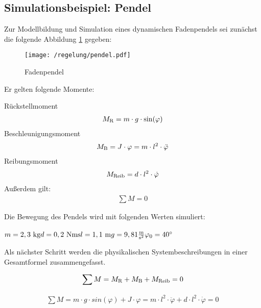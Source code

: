 \subsection{Simulationsbeispiel: Pendel}

Zur Modellbildung und Simulation eines dynamischen Fadenpendels sei zunächst die folgende Abbildung \ref{fig:pendel} gegeben:

\begin{figure}[h]
	\centering
	\texttt{[image: /regelung/pendel.pdf]}
	\label{fig:pendel}
	\caption{Fadenpendel}
\end{figure}

Er gelten folgende Momente:

Rückstellmoment
\begin{align}
		M_\i{R} = m \cdot g \cdot \si{sin}(\varphi)
		\label{rueckstellmoment} 
\end{align}
Beschleunigungsmoment
\begin{align}
	M_\i{B} = J \cdot \varphi = m \cdot l^{2} \cdot \ddot\varphi
	\label{beschleunigungsmoment} 
\end{align}
Reibungsmoment
\begin{align}
	M_\i{Reib} = d \cdot l^{2} \cdot \dot\varphi
	\label{reibungsmoment} 
\end{align}
Außerdem gilt:
\begin{align}
	\sum M = 0
	\label{momentengleichgewicht} 
\end{align}

Die Bewegung des Pendels wird mit folgenden Werten simuliert:\\
\\
$ m = 2,3 ~\mathrm{kg}\\ d = 0,2 ~\mathrm{Nms}\\ l = 1,1 ~\mathrm{m}\\ g = 9,81\tfrac{\mathrm{m}}{\mathrm{s^{2}}} \\ \varphi_{\mathrm{0}} = 40^{\circ}$

Als nächster Schritt werden die physikalischen Systembeschreibungen in einer Gesamtformel zusammengefasst. 

\begin{align}
	\sum M = M_\i{R} + M_\i{B} + M_\i{Reib} = 0
	\label{momentengleichgewichtgesamt} 
\end{align}

\begin{align}
	\sum M = m \cdot g \cdot \si{sin}(\varphi) + J \cdot \varphi = m \cdot l^{2} \cdot \ddot\varphi + d \cdot l^{2} \cdot \dot\varphi = 0
	\label{momentengleichgewichtgesamt2} 
\end{align}

